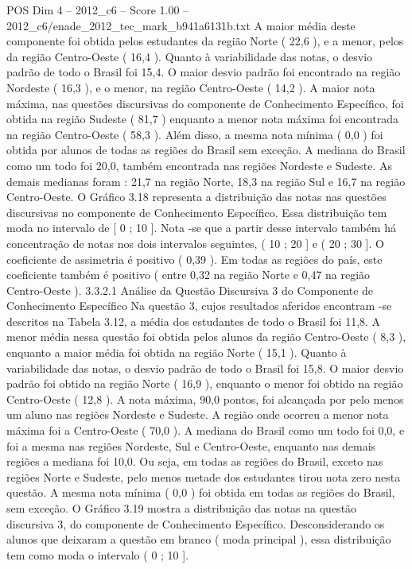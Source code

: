 \begin{textsample}{POS Dim 4 – 2012\_c6 – Score 1.00 – 2012\_c6/enade\_2012\_tec\_mark\_b941a6131b.txt}
A maior média deste componente foi obtida pelos estudantes da região Norte ( 22,6 ), e a menor, pelos da região Centro-Oeste ( 16,4 ).
Quanto à variabilidade das notas, o desvio padrão de todo o Brasil foi 15,4.
O maior desvio padrão foi encontrado na região Nordeste ( 16,3 ), e o menor, na região Centro-Oeste ( 14,2 ).
A maior nota máxima, nas questões discursivas do componente de Conhecimento Específico, foi obtida na região Sudeste ( 81,7 ) enquanto a menor nota máxima foi encontrada na região Centro-Oeste ( 58,3 ).
Além disso, a mesma nota mínima ( 0,0 ) foi obtida por alunos de todas as regiões do Brasil sem exceção.
A mediana do Brasil como um todo foi 20,0, também encontrada nas regiões Nordeste e Sudeste.
As demais medianas foram : 21,7 na região Norte, 18,3 na região Sul e 16,7 na região Centro-Oeste.
O Gráfico 3.18 representa a distribuição das notas nas questões discursivas no componente de Conhecimento Específico.
Essa distribuição tem moda no intervalo de [ 0 ; 10 ].
Nota -se que a partir desse intervalo também há concentração de notas nos dois intervalos seguintes, ( 10 ; 20 ] e ( 20 ; 30 ].
O coeficiente de assimetria é positivo ( 0,39 ).
Em todas as regiões do país, este coeficiente também é positivo ( entre 0,32 na região Norte e 0,47 na região Centro-Oeste ). 3.3.2.1 Análise da Questão Discursiva 3 do Componente de Conhecimento Específico Na questão 3, cujos resultados aferidos encontram -se descritos na Tabela 3.12, a média dos estudantes de todo o Brasil foi 11,8.
A menor média nessa questão foi obtida pelos alunos da região Centro-Oeste ( 8,3 ), enquanto a maior média foi obtida na região Norte ( 15,1 ).
Quanto à variabilidade das notas, o desvio padrão de todo o Brasil foi 15,8.
O maior desvio padrão foi obtido na região Norte ( 16,9 ), enquanto o menor foi obtido na região Centro-Oeste ( 12,8 ).
A nota máxima, 90,0 pontos, foi alcançada por pelo menos um aluno nas regiões Nordeste e Sudeste.
A região onde ocorreu a menor nota máxima foi a Centro-Oeste ( 70,0 ).
A mediana do Brasil como um todo foi 0,0, e foi a mesma nas regiões Nordeste, Sul e Centro-Oeste, enquanto nas demais regiões a mediana foi 10,0.
Ou seja, em todas as regiões do Brasil, exceto nas regiões Norte e Sudeste, pelo menos metade dos estudantes tirou nota zero nesta questão.
A mesma nota mínima ( 0,0 ) foi obtida em todas as regiões do Brasil, sem exceção.
O Gráfico 3.19 mostra a distribuição das notas na questão discursiva 3, do componente de Conhecimento Específico.
Desconsiderando os alunos que deixaram a questão em branco ( moda principal ), essa distribuição tem como moda o intervalo ( 0 ; 10 ].

\end{textsample}
